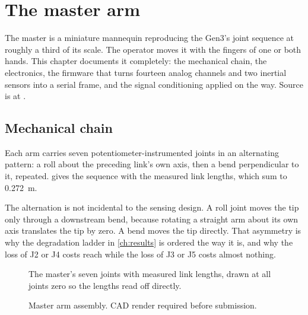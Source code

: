 \chapter{The master arm}
\label{ch:master}

The master is a miniature mannequin reproducing the Gen3's joint sequence at
roughly a third of its scale. The operator moves it with the fingers of one or
both hands. This chapter documents it completely: the mechanical chain, the
electronics, the firmware that turns fourteen analog channels and two inertial
sensors into a serial frame, and the signal conditioning applied on the way.
Source is at .

\section{Mechanical chain}

Each arm carries seven potentiometer-instrumented joints in an alternating
pattern: a roll about the preceding link's own axis, then a bend perpendicular
to it, repeated.  gives the sequence with the measured link
lengths, which sum to \SI{0.272}{\metre}.

The alternation is not incidental to the sensing design. A roll joint moves
the tip only through a downstream bend, because rotating a straight arm about
its own axis translates the tip by zero. A bend moves the tip directly. That
asymmetry is why the degradation ladder in \cref{ch:results} is ordered the
way it is, and why the loss of J2 or J4 costs reach while the loss of J3 or J5
costs almost nothing.

\begin{figure}[htbp]
  \centering
  
  \caption[Master kinematic chain]{The master's seven joints with measured
  link lengths, drawn at all joints zero so the lengths read off directly.}
  \label{fig:kinchain}
\end{figure}

\begin{figure}[htbp]
  \centering
  \caption[Master arm CAD]{Master arm assembly. CAD render required before
  submission.}
  \label{fig:master-cad}
\end{figure}

